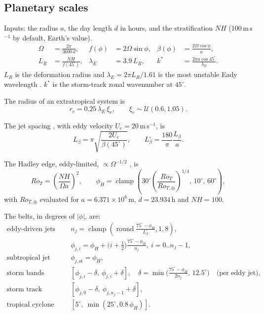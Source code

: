 \documentclass[11pt,a4paper]{article}
\begin{document}
\subsection{Planetary scales}
\label{sec:eq-scales}
Inputs: the radius $a$, the day length $d$ in hours, and the stratification
$NH$ ($100$\,m\,s$^{-1}$ by default, Earth's value).
\begin{align}
  \Omega &= \frac{2\pi}{3600\,d}, &
  f(\phi) &= 2\Omega\sin\phi, &
  \beta(\phi) &= \frac{2\Omega\cos\phi}{a}, \\
  L_R &= \frac{NH}{f(45^\circ)}, &
  \lambda_E &= 3.9\,L_R, &
  k^* &= \frac{2\pi a\cos 45^\circ}{\lambda_E}.
\end{align}
$L_R$ is the deformation radius and $\lambda_E = 2\pi L_R/1.61$ is the most unstable Eady
wavelength \cite{holton2013,vallis2017}. $k^*$ is the storm-track zonal wavenumber at
$45^\circ$.

The radius of an extratropical system is
\begin{equation}
  r_c = 0.25\,\lambda_E\,\xi_r,\qquad \xi_r\sim\mathcal{U}(0.6,1.05).
\end{equation}

The jet spacing \cite{williams1978,rhines1975}, with eddy velocity $U_e=20$\,m\,s$^{-1}$, is
\begin{equation}
  L_\beta = \pi\sqrt{\frac{2U_e}{\beta(45^\circ)}},\qquad
  L_\beta^\circ = \frac{180}{\pi}\frac{L_\beta}{a}.
\end{equation}

The Hadley edge, eddy-limited, $\propto\Omega^{-1/2}$ \cite{schneider2006}, is
\begin{equation}
  Ro_T = \left(\frac{NH}{\Omega a}\right)^2,\qquad
  \phi_H = \operatorname{clamp}\!\left(30^\circ\left(\frac{Ro_T}{Ro_{T,\oplus}}\right)^{1/4},
  \,10^\circ,\,60^\circ\right),
\end{equation}
with $Ro_{T,\oplus}$ evaluated for $a=6.371\times10^6$\,m, $d=23.934$\,h and $NH=100$.

The belts, in degrees of $|\phi|$, are:
\begin{align}
  \text{eddy-driven jets}\quad & n_j=\operatorname{clamp}\!\left(\operatorname{round}
     \frac{75^\circ-\phi_H}{L_\beta^\circ},1,8\right),\\
  & \phi_{j,i}=\phi_H+\Big(i+\tfrac12\Big)\frac{75^\circ-\phi_H}{n_j},\ i=0..n_j-1,\\
  \text{subtropical jet}\quad & \phi_{j,\mathrm{st}}=\phi_H,\\
  \text{storm bands}\quad & [\phi_{j,i}-\delta,\ \phi_{j,i}+\delta],\quad
     \delta=\min\!\Big(\frac{75^\circ-\phi_H}{2n_j},\,12.5^\circ\Big)\quad\text{(per eddy jet)},\\
  \text{storm track}\quad & [\phi_{j,0}-\delta,\ \phi_{j,n_j-1}+\delta],\\
  \text{tropical cyclone band}\quad & [5^\circ,\ \min(25^\circ,0.8\,\phi_H)].
\end{align}
\end{document}
